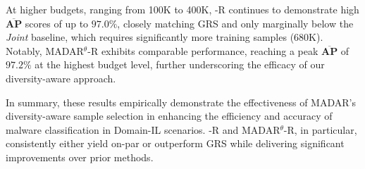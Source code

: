 At higher budgets, ranging from 100K to 400K, \system-R continues to demonstrate high $\mathbf{\overline{AP}}$ scores of up to $97.0\%$, closely matching GRS and only marginally below the \textit{Joint} baseline, which requires significantly more training samples (680K). Notably, MADAR$^\theta$-R exhibits comparable performance, reaching a peak $\mathbf{\overline{AP}}$ of $97.2\%$ at the highest budget level, further underscoring the efficacy of our diversity-aware approach.







In summary, these results empirically demonstrate the effectiveness of MADAR's diversity-aware sample selection in enhancing the efficiency and accuracy of malware classification in Domain-IL scenarios. \system-R and MADAR$^\theta$-R, in particular, consistently either yield on-par or outperform GRS while delivering significant improvements over prior methods.
















